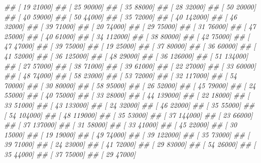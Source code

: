 \documentclass[
]{book}
\newenvironment{Shaded}{\begin{snugshade}}{\end{snugshade}}
\newcommand{\CommentTok}[1]{\textcolor[rgb]{0.56,0.35,0.01}{\textit{#1}}}
\theoremstyle{definition}
\theoremstyle{definition}
\theoremstyle{definition}
\theoremstyle{definition}
\theoremstyle{remark}
\begin{document}
\begin{Shaded}
\begin{Highlighting}[]
\CommentTok{\#\#  [    19  21000]}
\CommentTok{\#\#  [    25  90000]}
\CommentTok{\#\#  [    35  88000]}
\CommentTok{\#\#  [    28  32000]}
\CommentTok{\#\#  [    50  20000]}
\CommentTok{\#\#  [    40  59000]}
\CommentTok{\#\#  [    50  44000]}
\CommentTok{\#\#  [    35  72000]}
\CommentTok{\#\#  [    40 142000]}
\CommentTok{\#\#  [    46  32000]}
\CommentTok{\#\#  [    39  71000]}
\CommentTok{\#\#  [    20  74000]}
\CommentTok{\#\#  [    29  75000]}
\CommentTok{\#\#  [    31  76000]}
\CommentTok{\#\#  [    47  25000]}
\CommentTok{\#\#  [    40  61000]}
\CommentTok{\#\#  [    34 112000]}
\CommentTok{\#\#  [    38  80000]}
\CommentTok{\#\#  [    42  75000]}
\CommentTok{\#\#  [    47  47000]}
\CommentTok{\#\#  [    39  75000]}
\CommentTok{\#\#  [    19  25000]}
\CommentTok{\#\#  [    37  80000]}
\CommentTok{\#\#  [    36  60000]}
\CommentTok{\#\#  [    41  52000]}
\CommentTok{\#\#  [    36 125000]}
\CommentTok{\#\#  [    48  29000]}
\CommentTok{\#\#  [    36 126000]}
\CommentTok{\#\#  [    51 134000]}
\CommentTok{\#\#  [    27  57000]}
\CommentTok{\#\#  [    38  71000]}
\CommentTok{\#\#  [    39  61000]}
\CommentTok{\#\#  [    22  27000]}
\CommentTok{\#\#  [    33  60000]}
\CommentTok{\#\#  [    48  74000]}
\CommentTok{\#\#  [    58  23000]}
\CommentTok{\#\#  [    53  72000]}
\CommentTok{\#\#  [    32 117000]}
\CommentTok{\#\#  [    54  70000]}
\CommentTok{\#\#  [    30  80000]}
\CommentTok{\#\#  [    58  95000]}
\CommentTok{\#\#  [    26  52000]}
\CommentTok{\#\#  [    45  79000]}
\CommentTok{\#\#  [    24  55000]}
\CommentTok{\#\#  [    40  75000]}
\CommentTok{\#\#  [    33  28000]}
\CommentTok{\#\#  [    44 139000]}
\CommentTok{\#\#  [    22  18000]}
\CommentTok{\#\#  [    33  51000]}
\CommentTok{\#\#  [    43 133000]}
\CommentTok{\#\#  [    24  32000]}
\CommentTok{\#\#  [    46  22000]}
\CommentTok{\#\#  [    35  55000]}
\CommentTok{\#\#  [    54 104000]}
\CommentTok{\#\#  [    48 119000]}
\CommentTok{\#\#  [    35  53000]}
\CommentTok{\#\#  [    37 144000]}
\CommentTok{\#\#  [    23  66000]}
\CommentTok{\#\#  [    37 137000]}
\CommentTok{\#\#  [    31  58000]}
\CommentTok{\#\#  [    33  41000]}
\CommentTok{\#\#  [    45  22000]}
\CommentTok{\#\#  [    30  15000]}
\CommentTok{\#\#  [    19  19000]}
\CommentTok{\#\#  [    49  74000]}
\CommentTok{\#\#  [    39 122000]}
\CommentTok{\#\#  [    35  73000]}
\CommentTok{\#\#  [    39  71000]}
\CommentTok{\#\#  [    24  23000]}
\CommentTok{\#\#  [    41  72000]}
\CommentTok{\#\#  [    29  83000]}
\CommentTok{\#\#  [    54  26000]}
\CommentTok{\#\#  [    35  44000]}
\CommentTok{\#\#  [    37  75000]}
\CommentTok{\#\#  [    29  47000]}

\end{Highlighting}
\end{Shaded}
\end{document}
